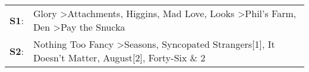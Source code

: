 \begin{supertabular}{p{0.03\textwidth}p{0.92\textwidth}}
 \textbf{S1}:  &  Glory\textsuperscript{} \textgreater \enspace Attachments\textsuperscript{}, \enspace Higgins\textsuperscript{}, \enspace Mad Love\textsuperscript{}, \enspace Looks\textsuperscript{} \textgreater \enspace Phil's Farm\textsuperscript{}, \enspace Den\textsuperscript{} \textgreater \enspace Pay the Snucka\textsuperscript{}  \enspace  \\
 \textbf{S2}:  &                                                             Nothing Too Fancy\textsuperscript{} \textgreater \enspace Seasons\textsuperscript{}, \enspace Syncopated Strangers[1]\textsuperscript{}, \enspace It Doesn't Matter\textsuperscript{}, \enspace August[2]\textsuperscript{}, \enspace Forty-Six \& 2\textsuperscript{}  \enspace  \\
\end{supertabular}

